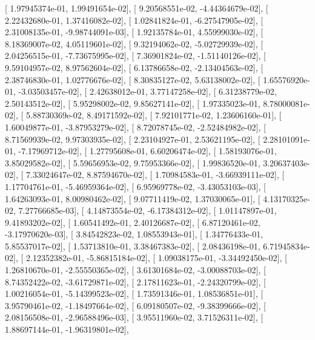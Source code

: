 \documentclass{article}
\begin{document}
       [  1.97945374e-01,   1.99491654e-02],
       [  9.20568551e-02,  -4.44364679e-02],
       [  2.22432680e-01,   1.37416082e-02],
       [  1.02841824e-01,  -6.27547905e-02],
       [  2.31008135e-01,  -9.98744091e-03],
       [  1.92135784e-01,   4.55999030e-02],
       [  8.18369007e-02,   4.05119601e-02],
       [  9.32194062e-02,  -5.02729939e-02],
       [  2.04256515e-01,  -7.73675995e-02],
       [  7.36901824e-02,  -1.51140126e-02],
       [  9.59104957e-02,   8.97562604e-02],
       [  6.13786658e-02,  -2.13404563e-02],
       [  2.38746830e-01,   1.02776676e-02],
       [  8.30835127e-02,   5.63138002e-02],
       [  1.65576920e-01,  -3.03503457e-02],
       [  2.42638012e-01,   3.77147258e-02],
       [  6.31238779e-02,   2.50143512e-02],
       [  5.95298002e-02,   9.85627141e-02],
       [  1.97335023e-01,   8.78000081e-02],
       [  5.88730369e-02,   8.49171592e-02],
       [  7.92101771e-02,   1.23606160e-01],
       [  1.60049877e-01,  -3.87953279e-02],
       [  8.72078745e-02,  -2.52484982e-02],
       [  8.71569939e-02,   9.97303935e-02],
       [  2.23104927e-01,   2.53621195e-02],
       [  2.28101091e-01,  -7.17969712e-02],
       [  1.27795608e-01,   6.60206474e-02],
       [  1.58193076e-01,   3.85029582e-02],
       [  5.59656953e-02,   9.75953366e-02],
       [  1.99836520e-01,   3.20637403e-02],
       [  7.33024647e-02,   8.87594670e-02],
       [  1.70984583e-01,  -3.66939111e-02],
       [  1.17704761e-01,  -5.46959364e-02],
       [  6.95969778e-02,  -3.43053103e-03],
       [  1.64263093e-01,   8.00980462e-02],
       [  9.07711419e-02,   1.37030065e-01],
       [  4.13170325e-02,   7.27766685e-03],
       [  4.14873554e-02,  -6.17384312e-02],
       [  1.01147897e-01,   9.41893202e-02],
       [  1.60541492e-01,   2.40126687e-02],
       [  6.87120461e-02,  -3.17970620e-03],
       [  3.84542823e-02,   1.08553943e-01],
       [  1.34776433e-01,   5.85537017e-02],
       [  1.53713810e-01,   3.38467383e-02],
       [  2.08436198e-01,   6.71945834e-02],
       [  2.12352382e-01,  -5.86815184e-02],
       [  1.09038175e-01,  -3.34492450e-02],
       [  1.26810670e-01,  -2.55550365e-02],
       [  3.61301684e-02,  -3.00088703e-02],
       [  8.74352422e-02,  -3.61729871e-02],
       [  2.17811623e-01,  -2.24320799e-02],
       [  1.00216054e-01,  -5.14399523e-02],
       [  1.73591346e-01,   1.08536851e-01],
       [  3.95790461e-02,  -1.18497664e-02],
       [  6.09180507e-02,  -9.38399666e-02],
       [  2.08156508e-01,  -2.96588496e-03],
       [  3.95511960e-02,   3.71526311e-02],
       [  1.88697144e-01,  -1.96319801e-02],
\end{document}
